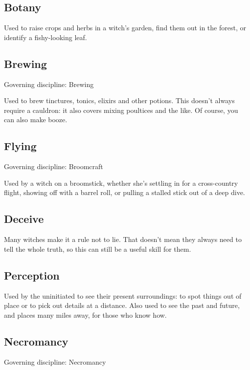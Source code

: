 \newcommand\govdisc[1]{Governing discipline: #1} %

\subsection{Botany}

Used to raise crops and herbs in a witch's garden, find them out in the forest, or identify a fishy-looking leaf.

\subsection{Brewing}
\govdisc{Brewing}

Used to brew tinctures, tonics, elixirs and other potions.
This doesn't always require a cauldron: it also covers mixing poultices and the like.
Of course, you can also make booze.

\subsection{Flying}
\govdisc{Broomcraft}

Used by a witch on a broomstick, whether she's settling in for a cross-country flight, showing off with a barrel roll, or pulling a stalled stick out of a deep dive.

\subsection{Deceive}

Many witches make it a rule not to lie.
That doesn't mean they always need to tell the whole truth, so this can still be a useful skill for them.

\subsection{Perception}

Used by the uninitiated to see their present surroundings: to spot things out of place or to pick out details at a distance.
Also used to see the past and future, and places many miles away, for those who know how.

\subsection{Necromancy}
\govdisc{Necromancy}

